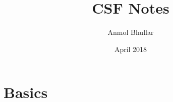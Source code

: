 \documentclass{article}
\title{CSF Notes}
\author{Anmol Bhullar}
\date{April 2018}
\begin{document}
\maketitle

\section{Basics}
\end{document}
